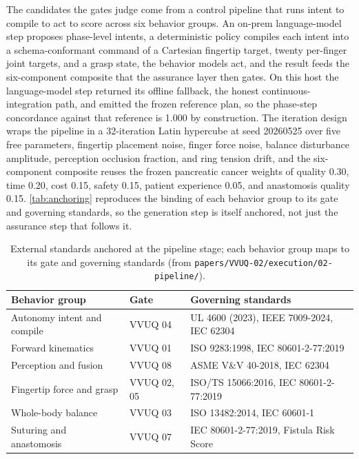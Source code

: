 The candidates the gates judge come from a control pipeline that runs intent to
compile to act to score across six behavior groups. An on-prem language-model
step proposes phase-level intents, a deterministic policy compiles each intent
into a schema-conformant command of a Cartesian fingertip target, twenty
per-finger joint targets, and a grasp state, the behavior models act, and the
result feeds the six-component composite that the assurance layer then gates. On
this host the language-model step returned its offline fallback, the honest
continuous-integration path, and emitted the frozen reference plan, so the
phase-step concordance against that reference is 1.000 by construction. The
iteration design wraps the pipeline in a 32-iteration Latin hypercube at seed
20260525 over five free parameters, fingertip placement noise, finger force
noise, balance disturbance amplitude, perception occlusion fraction, and ring
tension drift, and the six-component composite reuses the frozen pancreatic
cancer weights of quality 0.30, time 0.20, cost 0.15, safety 0.15, patient
experience 0.05, and anastomosis quality 0.15. \autoref{tab:anchoring} reproduces
the binding of each behavior group to its gate and governing standards, so the
generation step is itself anchored, not just the assurance step that follows it.

\begin{table}[H]
\caption{External standards anchored at the pipeline stage; each behavior group
maps to its gate and governing standards (from
\texttt{papers/VVUQ-02/execution/02-pipeline/}).}
\label{tab:anchoring}
\centering
\footnotesize
\begin{tabularx}{\textwidth}{L{4.2cm} L{2.2cm} Y}
\toprule
\textbf{Behavior group} & \textbf{Gate} & \textbf{Governing standards} \\
\midrule
Autonomy intent and compile & VVUQ 04 & UL 4600 (2023), IEEE 7009-2024, IEC 62304 \\
Forward kinematics & VVUQ 01 & ISO 9283:1998, IEC 80601-2-77:2019 \\
Perception and fusion & VVUQ 08 & ASME V\&V 40-2018, IEC 62304 \\
Fingertip force and grasp & VVUQ 02, 05 & ISO/TS 15066:2016, IEC 80601-2-77:2019 \\
Whole-body balance & VVUQ 03 & ISO 13482:2014, IEC 60601-1 \\
Suturing and anastomosis & VVUQ 07 & IEC 80601-2-77:2019, Fistula Risk Score \\
\bottomrule
\end{tabularx}
\end{table}

